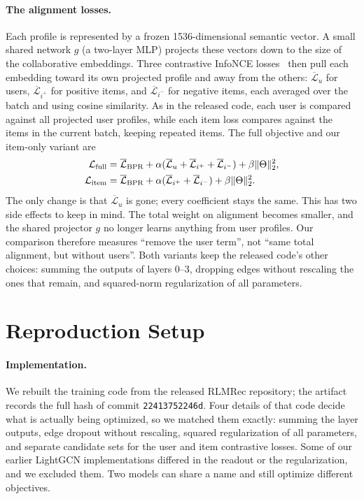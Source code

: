 \documentclass[runningheads]{llncs}
\begin{document}
\paragraph{The alignment losses.}
Each profile is represented by a frozen 1536-dimensional semantic vector. A
small shared network $g$ (a two-layer MLP) projects these vectors down to the
size of the collaborative embeddings. Three contrastive InfoNCE
losses~\cite{infonce} then pull each embedding toward its own projected
profile and away from the others: $\overline{\mathcal L}_u$ for users,
$\overline{\mathcal L}_{i^+}$ for positive items, and
$\overline{\mathcal L}_{i^-}$ for negative items, each averaged over the batch
and using cosine similarity. As in the released code, each user is compared
against all projected user profiles, while each item loss compares against the
items in the current batch, keeping repeated items. The full objective and our
item-only variant are
\begin{align}
 \mathcal L_{\rm full}&=\overline{\mathcal L}_{\rm BPR}
 +\alpha(\overline{\mathcal L}_u+\overline{\mathcal L}_{i^+}
 +\overline{\mathcal L}_{i^-})+\beta\|\Theta\|_2^2,\\
 \mathcal L_{\rm item}&=\overline{\mathcal L}_{\rm BPR}
 +\alpha(\overline{\mathcal L}_{i^+}+\overline{\mathcal L}_{i^-})
 +\beta\|\Theta\|_2^2.
\end{align}
The only change is that $\overline{\mathcal L}_u$ is gone; every coefficient
stays the same. This has two side effects to keep in mind. The total weight
on alignment becomes smaller, and the shared projector $g$ no longer learns
anything from user profiles. Our comparison therefore measures ``remove the
user term'', not ``same total alignment, but without users''. Both variants
keep the released code's other choices: summing the outputs of layers 0--3,
dropping edges without rescaling the ones that remain, and squared-norm
regularization of all parameters.

\section{Reproduction Setup}
\paragraph{Implementation.}
We rebuilt the training code from the released RLMRec repository; the
artifact records the full hash of commit \texttt{22413752246d}. Four details
of that code decide what is actually being optimized, so we matched them
exactly: summing the layer outputs, edge dropout without rescaling, squared
regularization of all parameters, and separate candidate sets for the user and
item contrastive losses. Some of our earlier LightGCN implementations differed
in the readout or the regularization, and we excluded them. Two models can
share a name and still optimize different objectives.
\end{document}

